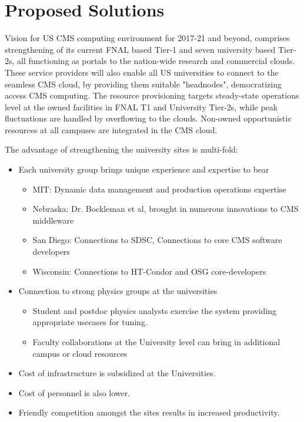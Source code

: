 \section{Proposed Solutions}

Vision for US CMS computing environment for 2017-21 and beyond, comprises
strengthening of its current FNAL based Tier-1 and seven university based
Tier-2s, all functioning as portals to the nation-wide research and commercial
clouds. These service providers will also enable all US universities to 
connect to the seamless CMS cloud, by providing them suitable 
"headnodes", democratizing access CMS computing. The resource 
provisioning targets steady-state operations level  at the owned facilities in
FNAL T1 and University Tier-2s, while peak fluctuations are handled by 
overflowing to the clouds. Non-owned opportunistic resources at all 
campuses are integrated in the CMS cloud.

The advantage of strengthening the university sites is multi-fold:
\begin{itemize}
\item Each university group brings unique experience and expertise to bear
\begin{itemize}
\item MIT: Dynamic data management and production operations expertise
\item Nebraska: Dr. Bockleman et al, brought in numerous innovations to CMS middleware
\item San Diego: Connections to SDSC, Connections to core CMS software developers
\item Wisconsin: Connections to HT-Condor and OSG core-developers
\end{itemize}
\item Connection to strong physics groups at the universities
\begin{itemize}
\item Student and postdoc physics analysts exercise the system providing
appropriate usecases for tuning. 
\item Faculty collaborations at the University level can bring in additional
campus or cloud resources
\end{itemize}
\item Cost of infrastructure is subsidized at the Universities.
\item Cost of personnel is also lower.
\item Friendly competition amongst the sites results in increased productivity.
\end{itemize}


